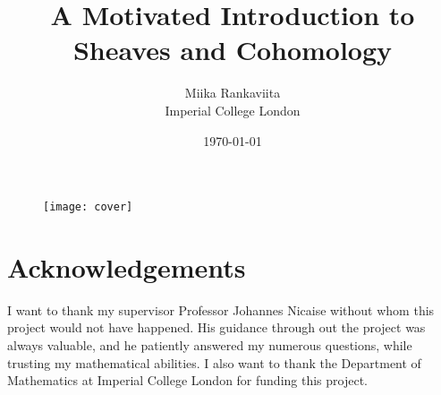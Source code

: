 \documentclass[12pt]{article}
\begin{document}
\title{A Motivated Introduction to Sheaves and Cohomology}
\author{Miika Rankaviita\\Imperial College London}
\date{\today}
\maketitle
\begin{figure}[H]
  \centering
  \texttt{[image: cover]}
\end{figure}
\newpage
\tableofcontents

\theoremstyle{plain}
\newtheorem{thm}{Theorem}[section]
\newtheorem{cor}{Corollary}[thm]
\newtheorem{prop}[thm]{Proposition}
\newtheorem{lemm}[thm]{Lemma}
\newtheorem*{rem}{Remark}
\newtheorem*{claim}{Claim}
\theoremstyle{definition}
\newtheorem{defin}[thm]{Definition}
\newtheorem{ex}[thm]{Example}


\renewcommand{\phi}{\varphi}
\newcommand{\diffs}[1]{\Omega\left(#1\right)}
\newcommand{\dual}[1]{H^1(X,\mathcal{L}\left(#1\right))^{\vee}}
\newcommand{\duals}{H^1(X,\mathcal{L}(\kern.08em\bullet\kern.08em))^{\vee}}
\renewcommand{\emptyset}{\text{\O}}
\newcommand{\cm}{\widetilde{M}}







\section*{Acknowledgements}
I want to thank my supervisor Professor Johannes Nicaise without whom this
project would not have happened. His guidance through out the project was
always valuable, and he patiently answered my numerous questions, while
trusting my mathematical abilities. I also want to thank the Department of
Mathematics at Imperial College London for funding this project.



\end{document}
